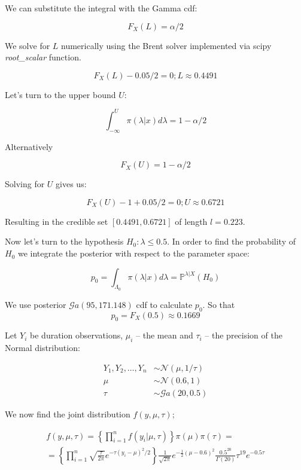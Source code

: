 \documentclass[a4 paper]{article}
\begin{document}
We can substitute the integral with the Gamma cdf:

$$
F_{X}(L) =\alpha / 2
$$

We solve for $L$ numerically using the Brent solver 
implemented via scipy \textit{root\_scalar} function. 

$$
F_{X}(L) - 0.05 / 2 = 0; L\approx 0.4491
$$

Let's turn to the upper bound $U$:

$$
\int_{-\infty}^{U} \pi(\lambda | x) d \lambda= 1 - \alpha / 2
$$

Alternatively

$$
F_{X}(U) = 1 - \alpha / 2
$$

Solving for $U$ gives us:

$$
F_{X}(U) - 1 + 0.05 / 2 = 0; U \approx 0.6721
$$

Resulting in the credible set 
$[0.4491, 0.6721]$ of length $l=0.223$. \newline


Now let's turn to the hypothesis $H_0: \lambda \le 0.5$.
In order to find the probability of $H_0$ we 
integrate the posterior with respect to 
the parameter space:

$$
{p_{0}=\int_{\Lambda_{0}} \pi(\lambda | x) d \lambda=\mathbb{P}^{\lambda | X}\left(H_{0}\right)}
$$

We use posterior $\mathcal{G}a\left(95,171.148\right)$ cdf 
to calculate $p_0$. So that
$$
p_{0}=F_{X}(0.5)\approx 0.1669
$$









Let $Y_i$ be duration observations,
$\mu_i$ -- the mean and $\tau_i$ -- the 
precision of the Normal distribution:  

$$
\begin{aligned}
	Y_{1}, Y_{2}, \ldots, Y_{n} & \sim \mathcal{N}(\mu, 1 / \tau) \\
	\mu & \sim \mathcal{N}(0.6, 1) \\
	\tau & \sim \mathcal{G}a(20, 0.5)
\end{aligned}
$$

We now find the joint distribution $f(y, \mu, \tau)$;

\begin{align*}
f(y,\mu,\tau)	=\left\{ \prod_{i=1}^{n}f\left(y_{i}|\mu,\tau\right)\right\} \pi(\mu)\pi(\tau)= \\
=	\left\{ \prod_{i=1}^{n}\sqrt{\frac{\tau}{2\pi}}e^{-\tau(y_{i}-\mu)^{2}/2}\right\} \frac{1}{\sqrt{2\pi}}e^{-\frac{1}{2}\left(\mu-0.6\right)^{2}}\frac{0.5^{20}}{\Gamma(20)}\tau^{19}e^{-0.5\tau}
\end{align*}
\end{document}
